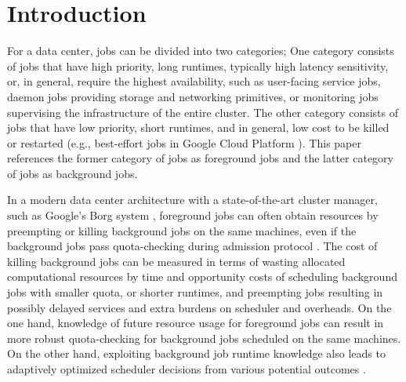 \documentclass[sigplan,10pt,review,anonymous]{acmart}
\begin{document}




\maketitle


\section{Introduction}

For a data center, jobs can be divided into two categories; One category
consists of jobs that have high priority, long runtimes, typically high latency
sensitivity, or, in general, require the highest availability, such as
user-facing service jobs, daemon jobs providing storage and networking
primitives, or monitoring jobs supervising the infrastructure of the entire
cluster. The other category consists of jobs that have low priority, short
runtimes, and in general, low cost to be killed or restarted (e.g., best-effort
jobs in Google Cloud Platform \cite{43438}). This paper references the former
category of jobs as foreground jobs and the latter category of jobs as
background jobs.

In a modern data center architecture with a state-of-the-art cluster manager,
such as Google's Borg system \cite{43438,10.1145/3342195.3387517}, foreground
jobs can often obtain resources by preempting or killing background jobs on the
same machines, even if the background jobs pass quota-checking during admission
protocol \cite{43438}. The cost of killing background jobs can be measured in
terms of wasting allocated computational resources by time and opportunity costs
of scheduling background jobs with smaller quota, or shorter runtimes, and
preempting jobs resulting in possibly delayed services and extra burdens on
scheduler and overheads. On the one hand, knowledge of future resource usage for
foreground jobs can result in more robust quota-checking for background jobs
scheduled on the same machines. On the other hand, exploiting background job
runtime knowledge also leads to adaptively optimized scheduler decisions from
various potential outcomes \cite{10.1145/3190508.3190515}.
\end{document}
